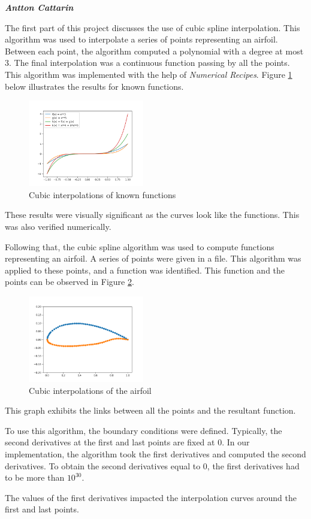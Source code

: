 \large \emph{\textbf{Antton Cattarin}}

The first part of this project discusses the use of cubic spline interpolation. This algorithm was used to interpolate a series of points representing an airfoil. Between each point, the algorithm computed a polynomial with a degree at most 3. The final interpolation was a continuous function passing by all the points. This algorithm was implemented with the help of \emph{Numerical Recipes}. Figure \ref{fig:interp} below illustrates the results for known functions.

\begin{figure}[h]
  \centering
  \includegraphics[width=0.45\textwidth]{img/interpolations.png}
  \caption{Cubic interpolations of known functions}
  \label{fig:interp}
\end{figure}

These results were visually significant as the curves look like the functions. This was also verified numerically.

\bigskip


Following that, the cubic spline algorithm was used to compute functions representing an airfoil. A series of points were given in a file. This algorithm was applied to these points, and a function was identified. This function and the points can be observed in Figure \ref{fig:airfoil}.

\begin{figure}[h]
  \centering
  \includegraphics[width=0.45\textwidth]{img/airfoil_interp.png}
  \caption{Cubic interpolations of the airfoil}
  \label{fig:airfoil}
\end{figure}
  
This graph exhibits the links between all the points and the resultant function.

\bigskip

To use this algorithm, the boundary conditions were defined. Typically, the second derivatives at the first and last points are fixed at 0. In our implementation, the algorithm took the first derivatives and computed the second derivatives. To obtain the second derivatives equal to 0, the first derivatives had to be more than $10^{30}$.

The values of the first derivatives impacted the interpolation curves around the first and last points.
